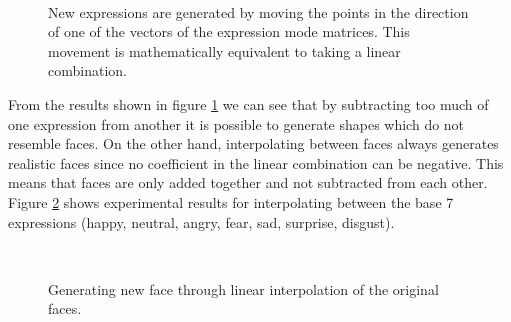 \documentclass[11pt,a4paper,twoside]{report}
\begin{document}
\begin{figure}[H]
\centering
{}\\

\caption{New expressions are generated by moving the points in the direction of one of
  the vectors of the expression mode matrices. This movement is mathematically
  equivalent to taking a linear combination.}\label{fg:faceaddsub}
\end{figure}

From the results shown in figure \ref{fg:faceaddsub} we can see that by
subtracting too much of one expression from another it is possible to generate
shapes which do not resemble faces. On the other hand, interpolating between
faces always generates realistic faces since no coefficient in the linear
combination can be negative. This means that faces are only added together and
not subtracted from each other. Figure \ref{fg:faceinter} shows experimental
results for interpolating between the base 7 expressions (happy, neutral, angry,
fear, sad, surprise, disgust).

\begin{figure}[H]
\centering
{}\\

\caption{Generating new face through linear interpolation of the original faces.}\label{fg:faceinter}
\end{figure}
\end{document}
